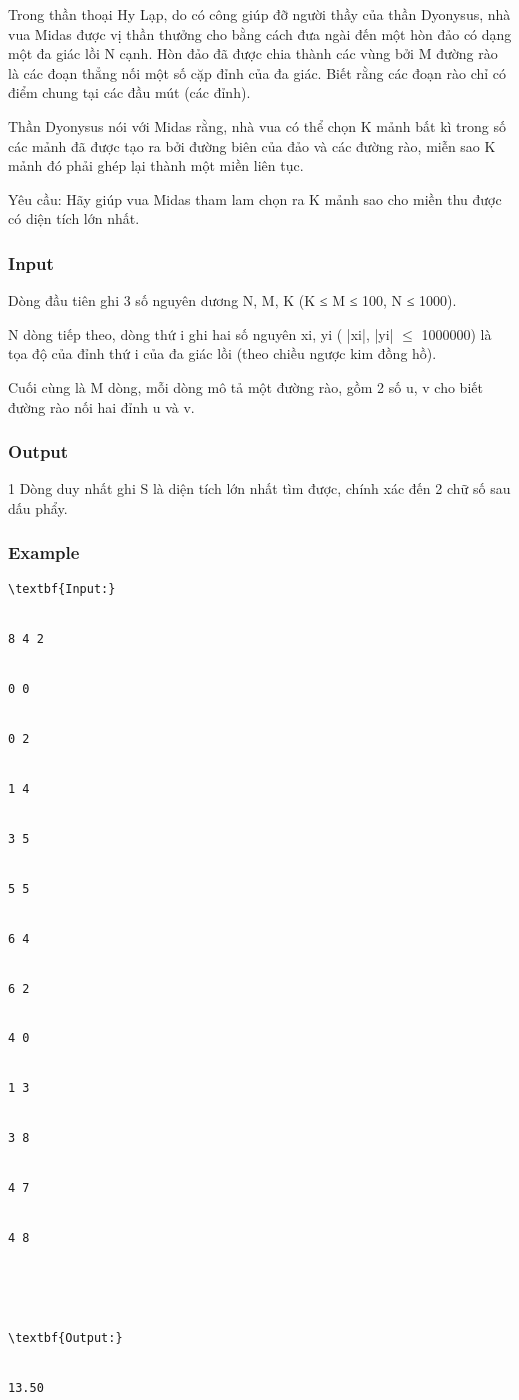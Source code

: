 



   Trong thần thoại Hy Lạp, do có công giúp đỡ người thầy của thần Dyonysus, nhà vua Midas được vị thần thưởng cho bằng  cách đưa ngài đến một hòn đảo có dạng một đa giác lồi N cạnh. Hòn đảo đã được chia thành các vùng bởi M đường rào là các đoạn thẳng nối một số cặp đỉnh của đa giác. Biết rằng các đoạn rào chỉ có điểm chung tại các đầu mút (các đỉnh).   


   Thần Dyonysus nói với Midas rằng, nhà vua có thể chọn K mảnh bất kì trong số các mảnh đã được tạo ra bởi đường biên của đảo và các đường rào, miễn sao K mảnh đó phải ghép lại thành một miền liên tục.   


   Yêu cầu: Hãy giúp vua Midas tham lam chọn ra K mảnh sao cho miền thu được có diện tích lớn nhất.  

\subsubsection{   Input  }

   Dòng đầu tiên ghi 3 số nguyên dương N, M, K (K ≤ M ≤ 100, N ≤ 1000).   


   N dòng tiếp theo, dòng thứ i ghi hai số nguyên xi, yi ( |xi|, |yi|  $\le$  1000000) là tọa độ của đỉnh thứ i của đa giác lồi (theo chiều ngược kim đồng hồ).   


   Cuối cùng là M dòng, mỗi dòng mô tả một đường rào, gồm 2 số u, v cho biết đường rào nối hai đỉnh u và v.  

\subsubsection{   Output  }

   1 Dòng duy nhất ghi S là diện tích lớn nhất tìm được, chính xác đến 2 chữ số sau dấu phẩy.  

\subsubsection{   Example  }
\begin{verbatim}
\textbf{Input:}


8 4 2


0 0


0 2


1 4


3 5


5 5


6 4


6 2


4 0


1 3


3 8


4 7


4 8





\textbf{Output:}


13.50


\end{verbatim}
